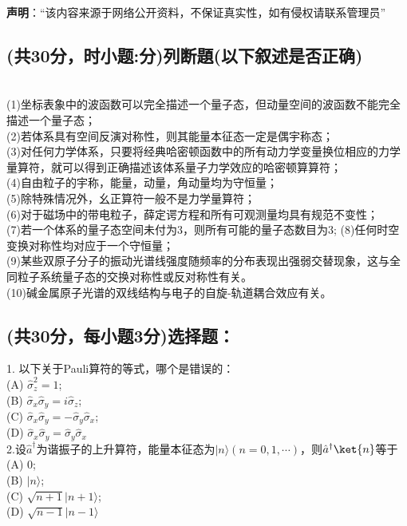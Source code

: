 
\textbf{声明}：“该内容来源于网络公开资料，不保证真实性，如有侵权请联系管理员”

\subsection{(共30分，时小题:分)列断題(以下叙述是否正确)}
\\(1)坐标表象中的波函数可以完全描述一个量子态，但动量空间的波函数不能完全描述一个量子态；\\
(2)若体系具有空间反演对称性，则其能量本征态一定是偶宇称态；\\
(3)对任何力学体系，只要将经典哈密顿函数中的所有动力学变量换位相应的力学量算符，就可以得到正确描述该体系量子力学效应的哈密顿算算符；\\
(4)自由粒子的宇称，能量，动量，角动量均为守恒量；\\
(5)除特殊情况外，幺正算符一般不是力学量算符；\\
(6)对于磁场中的带电粒子，薛定谔方程和所有可观测量均具有规范不变性；\\
(7)若一个体系的量子态空间未付为3，则所有可能的量子态数目为3;
(8)任何时空变换对称性均对应于一个守恒量；\\
(9)某些双原子分子的振动光谱线强度随频率的分布表现出强弱交替现象，这与全同粒子系统量子态的交换对称性或反对称性有关。\\
(10)碱金属原子光谱的双线结构与电子的自旋-轨道耦合效应有关。\\
\subsection{(共30分，每小题3分)选择题：}

1. 以下关于Pauli算符的等式，哪个是错误的：\\
   (A) $\hat{\sigma}_z^2 = 1$; \\
   (B) $\hat{\sigma}_x \hat{\sigma}_y = i\hat{\sigma}_z$; \\
   (C) $\hat{\sigma}_x \hat{\sigma}_y = -\hat{\sigma}_y \hat{\sigma}_x$; \\
   (D) $\hat{\sigma}_x \hat{\sigma}_y = \hat{\sigma}_y \hat{\sigma}_x$\\

2.设$\hat{a}^\dagger$为谐振子的上升算符，能量本征态为$|n\rangle (n=0,1,\cdots)$，则$\hat{a}^\dagger \ket{n}$等于\\
   (A) $0$;\\ 
   (B) $|n\rangle$; \\
   (C) $\sqrt{n+1}|n+1\rangle$; \\
   (D) $\sqrt{n-1}|n-1\rangle$\\

